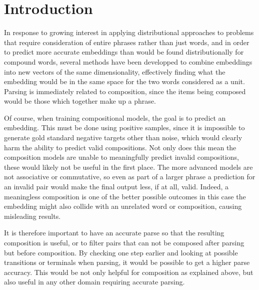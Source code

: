 \documentclass[a4paper, 12pt]{article}
\begin{document}


\section{Introduction}

In response to growing interest in applying distributional approaches to problems that require consideration of entire phrases rather than just words, and in order to predict more accurate embeddings than would be found distributionally for compound words, several methods have been developped to combine embeddings into new vectors of the same dimensionality, effectively finding what the embedding would be in the same space for the two words considered as a unit. Parsing is immediately related to composition, since the items being composed would be those which together make up a phrase.

Of course, when training compositional models, the goal is to predict an embedding. This must be done using positive samples, since it is impossible to generate gold standard negative targets other than noise, which would clearly harm the ability to predict valid compositions. Not only does this mean the composition models are unable to meaningfully predict invalid compositions, these would likely not be useful in the first place. The more advanced models are not associative or commutative, so even as part of a larger phrase a prediction for an invalid pair would make the final output less, if at all, valid. Indeed, a meaningless composition is one of the better possible outcomes in this case \textemdash the embedding might also collide with an unrelated word or composition, causing misleading results.

It is therefore important to have an accurate parse so that the resulting composition is useful, or to filter pairs that can not be composed after parsing but before composition. By checking one step earlier and looking at possible transitions or terminals when parsing, it would be possible to get a higher parse accuracy. This would be not only helpful for composition as explained above, but also useful in any other domain requiring accurate parsing.
\end{document}
